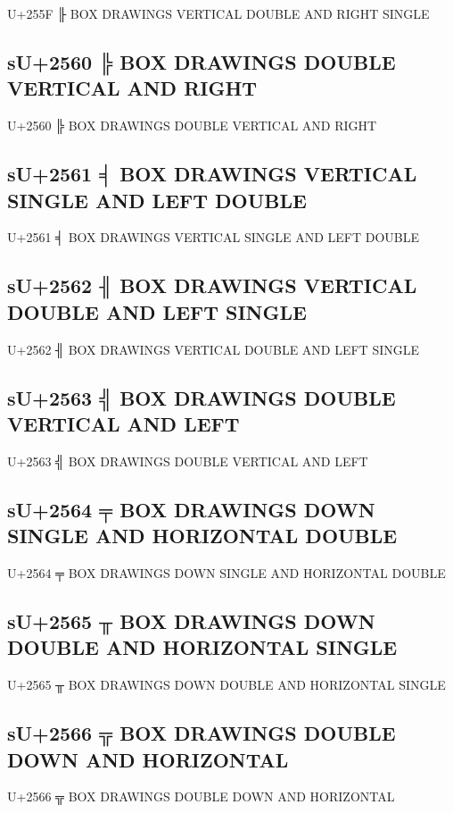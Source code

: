 U+255F ╟ BOX DRAWINGS VERTICAL DOUBLE AND RIGHT SINGLE

\subsection{sU+2560 ╠ BOX DRAWINGS DOUBLE VERTICAL AND RIGHT}

U+2560 ╠ BOX DRAWINGS DOUBLE VERTICAL AND RIGHT

\subsection{sU+2561 ╡ BOX DRAWINGS VERTICAL SINGLE AND LEFT DOUBLE}

U+2561 ╡ BOX DRAWINGS VERTICAL SINGLE AND LEFT DOUBLE

\subsection{sU+2562 ╢ BOX DRAWINGS VERTICAL DOUBLE AND LEFT SINGLE}

U+2562 ╢ BOX DRAWINGS VERTICAL DOUBLE AND LEFT SINGLE

\subsection{sU+2563 ╣ BOX DRAWINGS DOUBLE VERTICAL AND LEFT}

U+2563 ╣ BOX DRAWINGS DOUBLE VERTICAL AND LEFT

\subsection{sU+2564 ╤ BOX DRAWINGS DOWN SINGLE AND HORIZONTAL DOUBLE}

U+2564 ╤ BOX DRAWINGS DOWN SINGLE AND HORIZONTAL DOUBLE

\subsection{sU+2565 ╥ BOX DRAWINGS DOWN DOUBLE AND HORIZONTAL SINGLE}

U+2565 ╥ BOX DRAWINGS DOWN DOUBLE AND HORIZONTAL SINGLE

\subsection{sU+2566 ╦ BOX DRAWINGS DOUBLE DOWN AND HORIZONTAL}

U+2566 ╦ BOX DRAWINGS DOUBLE DOWN AND HORIZONTAL

